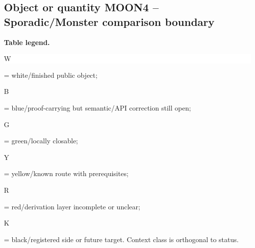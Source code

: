 \subsection*{Object or quantity MOON4 -- Sporadic/\allowbreak{}Monster comparison boundary}
\hypertarget{objproof:MOON4}{}
\par\smallskip\noindent\begin{minipage}{0.99\linewidth}\footnotesize\raggedright\textbf{Table legend.} \colorbox{white}{\strut W} = white/finished public object; \colorbox{cyan!20}{\strut B} = blue/proof-carrying but semantic/API correction still open; \colorbox{green!18}{\strut G} = green/locally closable; \colorbox{yellow!25}{\strut Y} = yellow/known route with prerequisites; \colorbox{red!20}{\strut R} = red/derivation layer incomplete or unclear; \colorbox{black!18}{\strut K} = black/registered side or future target. Context class is orthogonal to status.\end{minipage}\par\vspace{0.25em}
